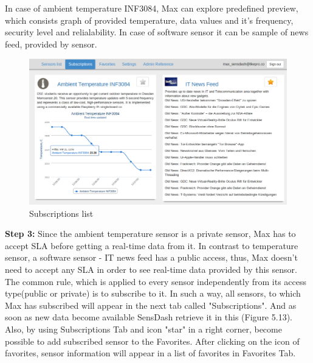  In case of ambient temperature INF3084, Max can explore predefined preview, which consists graph of provided temperature, data values and it's frequency, security level and relialability. In case of software sensor it can be sample of news feed, provided by sensor. 

\begin{figure}[!ht]
\centering
\includegraphics[scale=0.6]{Screenshots/UseCaseScreenshot4.png}   
\caption[Personal Subscribed Sensor]{Subscriptions list}                         
\end{figure}
\textbf{Step 3:} Since the ambient temperature sensor is a private sensor, Max has to accept SLA before getting a real-time data from it. In contrast to temperature sensor, a software sensor - IT news feed has a public access, thus, Max doesn't need to accept any SLA in order to see real-time data provided by this sensor. The common rule, which is applied to every sensor independently from its access type(public or private) is to subscribe to it. In such a way, all sensors, to which Max has subscribed will appear in the next tab called "Subscriptions". And as soon as new data become available SensDash retrieve it in this (Figure 5.13). Also, by using Subscriptions Tab and icon "star" in a right corner, become possible to add subscribed sensor to the Favorites. After clicking on the icon of favorites, sensor information will appear in a list of favorites in Favorites Tab.

